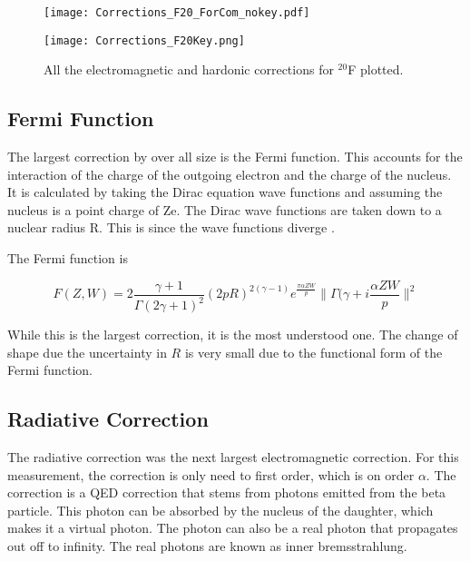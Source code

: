 \documentclass[../MaxHughesThesis.tex]{subfiles}
\begin{document}
\begin{figure}
    \centering
    \begin{minipage}{0.65\textwidth}
        \centerline{\texttt{[image: Corrections\_F20\_ForCom\_nokey.pdf]}} %
    \end{minipage}\hfill
    \begin{minipage}{0.35\textwidth}
        \centerline{\texttt{[image: Corrections\_F20Key.png]}}
    \end{minipage}
    \caption{All the electromagnetic and hardonic corrections for $^{20}$F plotted.}
    \label{fig:corrections}
\end{figure}

\subsection{Fermi Function}

The largest correction by over all size is the Fermi function.
This accounts for the interaction of the charge of the outgoing electron and the charge of the nucleus.
It is calculated by taking the Dirac equation wave functions and assuming the nucleus is a point charge of Ze.
The Dirac wave functions are taken down to a nuclear radius R.
This is since the wave functions diverge \cite{Wil89}.

The Fermi function is %

\begin{equation}
	F(Z,W) = 2\frac{\gamma + 1}{\Gamma(2\gamma +1)^{2}}(2pR)^{2(\gamma - 1)}e^{\frac{\pi\alpha ZW}{p}}\|\Gamma(\gamma + i\frac{\alpha ZW}{p}\|^{2}
	\label{eq:fermifunc}
\end{equation}

While this is the largest correction, it is the most understood one.
The change of shape due the uncertainty in $R$ is very small due to the functional form of the Fermi function. 

\subsection{Radiative Correction}
The radiative correction was the next largest electromagnetic correction.
For this measurement, the correction is only need to first order, which is on order $\alpha$.
The correction is a QED correction that stems from photons emitted from the beta particle.
This photon can be absorbed by the nucleus of the daughter, which makes it a virtual photon.
The photon can also be a real photon that propagates out off to infinity.
The real photons are known as inner bremsstrahlung.
\end{document}
